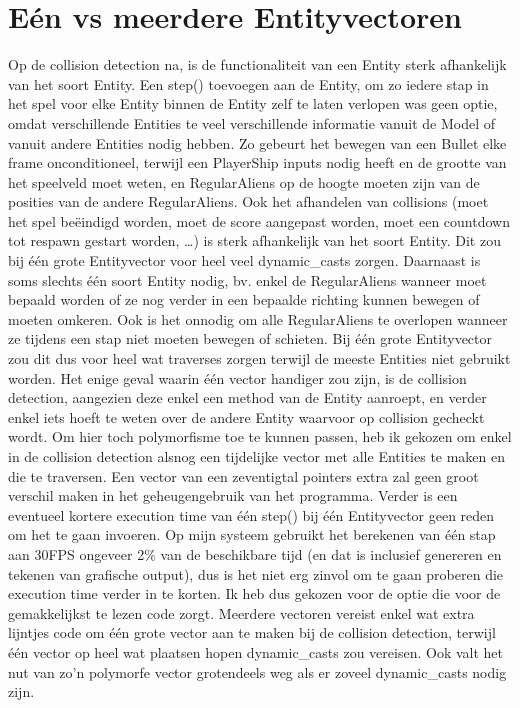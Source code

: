\documentclass[11pt, a4paper]{article}
\begin{document}
\section {E\'en vs meerdere Entityvectoren}
Op de collision detection na, is de functionaliteit van een Entity sterk afhankelijk van het soort Entity. Een step() toevoegen aan de Entity, om zo iedere stap in het spel voor elke Entity binnen de Entity zelf te laten verlopen was geen optie, omdat verschillende Entities te veel verschillende informatie vanuit de Model of vanuit andere Entities nodig hebben. Zo gebeurt het bewegen van een Bullet elke frame onconditioneel, terwijl een PlayerShip inputs nodig heeft en de grootte van het speelveld moet weten, en RegularAliens op de hoogte moeten zijn van de posities van de andere RegularAliens. Ook het afhandelen van collisions (moet het spel be\"eindigd worden, moet de score aangepast worden, moet een countdown tot respawn gestart worden, \ldots) is sterk afhankelijk van het soort Entity. Dit zou bij \'e\'en grote Entityvector voor heel veel dynamic\_casts zorgen. Daarnaast is soms slechts \'e\'en soort Entity nodig, bv. enkel de RegularAliens wanneer moet bepaald worden of ze nog verder in een bepaalde richting kunnen bewegen of moeten omkeren. Ook is het onnodig om alle RegularAliens te overlopen wanneer ze tijdens een stap niet moeten bewegen of schieten. Bij \'e\'en grote Entityvector zou dit dus voor heel wat traverses zorgen terwijl de meeste Entities niet gebruikt worden. Het enige geval waarin \'e\'en vector handiger zou zijn, is de collision detection, aangezien deze enkel een method van de Entity aanroept, en verder enkel iets hoeft te weten over de andere Entity waarvoor op collision gecheckt wordt. Om hier toch polymorfisme toe te kunnen passen, heb ik gekozen om enkel in de collision detection alsnog een tijdelijke vector met alle Entities te maken en die te traversen. Een vector van een zeventigtal pointers extra zal geen groot verschil maken in het geheugengebruik van het programma. Verder is een eventueel kortere execution time van \'e\'en step() bij \'e\'en Entityvector geen reden om het te gaan invoeren. Op mijn systeem gebruikt het berekenen van \'e\'en stap aan 30FPS ongeveer 2\% van de beschikbare tijd (en dat is inclusief genereren en tekenen van grafische output), dus is het niet erg zinvol om te gaan proberen die execution time verder in te korten. Ik heb dus gekozen voor de optie die voor de gemakkelijkst te lezen code zorgt. Meerdere vectoren vereist enkel wat extra lijntjes code om \'e\'en grote vector aan te maken bij de collision detection, terwijl \'e\'en vector op heel wat plaatsen hopen dynamic\_casts zou vereisen. Ook valt het nut van zo'n polymorfe vector grotendeels weg als er zoveel dynamic\_casts nodig zijn.

\end{document}
